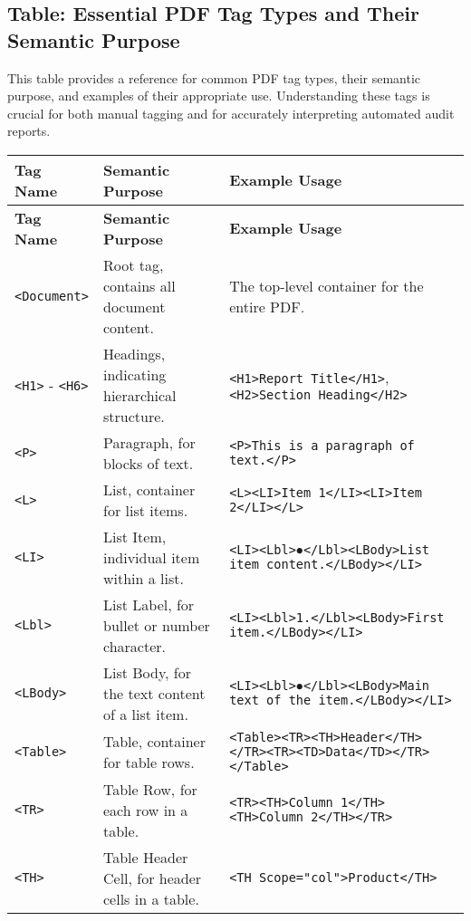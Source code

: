 \subsection{Table: Essential PDF Tag Types and Their Semantic Purpose}

This table provides a reference for common PDF tag types, their semantic purpose, and examples of their appropriate use. Understanding these tags is crucial for both manual tagging and for accurately interpreting automated audit reports.

\begin{longtable}{|l|l|p{6cm}|}
\hline
\textbf{Tag Name} & \textbf{Semantic Purpose} & \textbf{Example Usage} \\
\hline
\endfirsthead
\hline
\textbf{Tag Name} & \textbf{Semantic Purpose} & \textbf{Example Usage} \\
\hline
\endhead
\hline
\endfoot
\endlastfoot
\texttt{<Document>} & Root tag, contains all document content. & The top-level container for the entire PDF. \\
\hline
\texttt{<H1>} - \texttt{<H6>} & Headings, indicating hierarchical structure. & \texttt{<H1>Report Title</H1>}, \texttt{<H2>Section Heading</H2>} \\
\hline
\texttt{<P>} & Paragraph, for blocks of text. & \texttt{<P>This is a paragraph of text.</P>} \\
\hline
\texttt{<L>} & List, container for list items. & \texttt{<L><LI>Item 1</LI><LI>Item 2</LI></L>} \\
\hline
\texttt{<LI>} & List Item, individual item within a list. & \texttt{<LI><Lbl>$\bullet$</Lbl><LBody>List item content.</LBody></LI>} \\
\hline
\texttt{<Lbl>} & List Label, for bullet or number character. & \texttt{<LI><Lbl>1.</Lbl><LBody>First item.</LBody></LI>} \\
\hline
\texttt{<LBody>} & List Body, for the text content of a list item. & \texttt{<LI><Lbl>$\bullet$</Lbl><LBody>Main text of the item.</LBody></LI>} \\
\hline
\texttt{<Table>} & Table, container for table rows. & \texttt{<Table><TR><TH>Header</TH></TR><TR><TD>Data</TD></TR></Table>} \\
\hline
\texttt{<TR>} & Table Row, for each row in a table. & \texttt{<TR><TH>Column 1</TH><TH>Column 2</TH></TR>} \\
\hline
\texttt{<TH>} & Table Header Cell, for header cells in a table. & \texttt{<TH Scope="col">Product</TH>} \\

\end{longtable}
